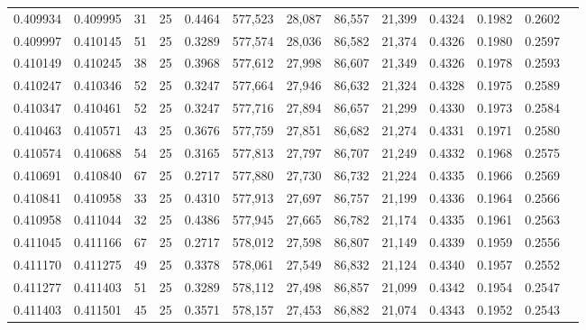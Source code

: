 \begin{tabular}{rrrrrrrrrrrrr}
0.409934 & 0.409995 &    31 &  25 &                                     0.4464 & 577,523 &  28,087 &  86,557 &  21,399 & 0.4324 & 0.1982 & 0.2602 \\
0.409997 & 0.410145 &    51 &  25 &                                     0.3289 & 577,574 &  28,036 &  86,582 &  21,374 & 0.4326 & 0.1980 & 0.2597 \\
0.410149 & 0.410245 &    38 &  25 &                                     0.3968 & 577,612 &  27,998 &  86,607 &  21,349 & 0.4326 & 0.1978 & 0.2593 \\
0.410247 & 0.410346 &    52 &  25 &                                     0.3247 & 577,664 &  27,946 &  86,632 &  21,324 & 0.4328 & 0.1975 & 0.2589 \\
0.410347 & 0.410461 &    52 &  25 &                                     0.3247 & 577,716 &  27,894 &  86,657 &  21,299 & 0.4330 & 0.1973 & 0.2584 \\
0.410463 & 0.410571 &    43 &  25 &                                     0.3676 & 577,759 &  27,851 &  86,682 &  21,274 & 0.4331 & 0.1971 & 0.2580 \\
0.410574 & 0.410688 &    54 &  25 &                                     0.3165 & 577,813 &  27,797 &  86,707 &  21,249 & 0.4332 & 0.1968 & 0.2575 \\
0.410691 & 0.410840 &    67 &  25 &                                     0.2717 & 577,880 &  27,730 &  86,732 &  21,224 & 0.4335 & 0.1966 & 0.2569 \\
0.410841 & 0.410958 &    33 &  25 &                                     0.4310 & 577,913 &  27,697 &  86,757 &  21,199 & 0.4336 & 0.1964 & 0.2566 \\
0.410958 & 0.411044 &    32 &  25 &                                     0.4386 & 577,945 &  27,665 &  86,782 &  21,174 & 0.4335 & 0.1961 & 0.2563 \\
0.411045 & 0.411166 &    67 &  25 &                                     0.2717 & 578,012 &  27,598 &  86,807 &  21,149 & 0.4339 & 0.1959 & 0.2556 \\
0.411170 & 0.411275 &    49 &  25 &                                     0.3378 & 578,061 &  27,549 &  86,832 &  21,124 & 0.4340 & 0.1957 & 0.2552 \\
0.411277 & 0.411403 &    51 &  25 &                                     0.3289 & 578,112 &  27,498 &  86,857 &  21,099 & 0.4342 & 0.1954 & 0.2547 \\
0.411403 & 0.411501 &    45 &  25 &                                     0.3571 & 578,157 &  27,453 &  86,882 &  21,074 & 0.4343 & 0.1952 & 0.2543 \\

\end{tabular}
